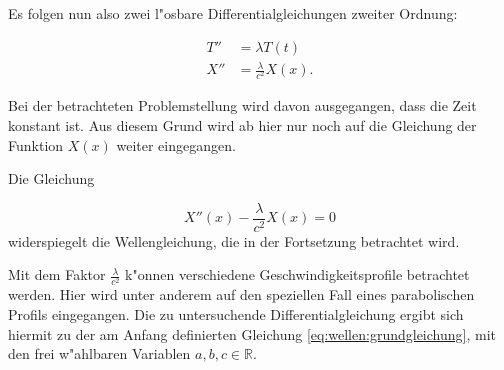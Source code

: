 Es folgen nun also zwei l"osbare Differentialgleichungen zweiter Ordnung:

\begin{align*}
	T'' &= \lambda T(t) \\
	X'' &= \frac{\lambda}{c^2}X(x).
\end{align*}

Bei der betrachteten Problemstellung wird davon ausgegangen, dass die 
Zeit konstant ist. Aus diesem Grund wird ab hier nur noch auf die Gleichung 
der Funktion $X(x)$ weiter eingegangen.

Die Gleichung

\begin{equation*}
	X''(x) - \frac{\lambda}{c^2} X(x) = 0
\end{equation*}
widerspiegelt die Wellengleichung, die in der Fortsetzung betrachtet wird.

Mit dem Faktor $\frac{\lambda}{c^2}$ k"onnen verschiedene 
Geschwindigkeitsprofile betrachtet werden. Hier wird unter anderem auf den 
speziellen Fall eines parabolischen Profils eingegangen. Die zu untersuchende 
Differentialgleichung ergibt sich hiermit zu der am Anfang definierten 
Gleichung \ref{eq:wellen:grundgleichung}, mit den frei w"ahlbaren Variablen 
${a,b,c} \in \mathbb{R}$.
